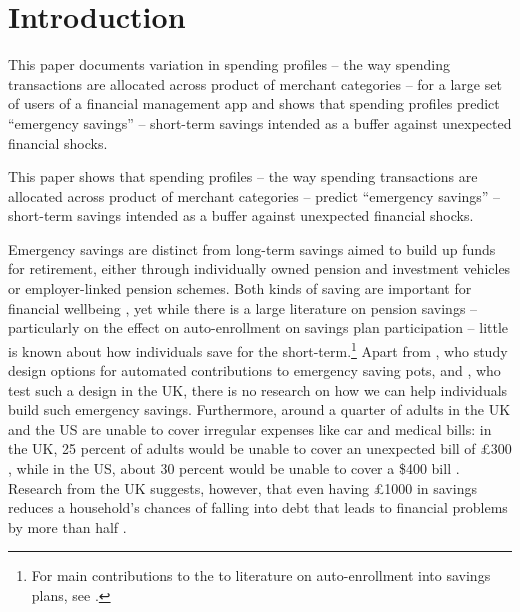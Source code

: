 
\section{Introduction}%
\label{sec:introduction}

{\color{red} This paper documents variation in spending profiles -- the way spending
transactions are allocated across product of merchant categories -- for a large
set of users of a financial management app and shows that spending profiles
predict ``emergency savings'' -- short-term savings intended as a buffer
against unexpected financial shocks.}

{\color{blue} This paper shows that spending profiles -- the way spending
transactions are allocated across product of merchant categories --
predict ``emergency savings'' -- short-term savings intended as a buffer
against unexpected financial shocks.}

Emergency savings are distinct from long-term savings aimed to build up funds
for retirement, either through individually owned pension and investment
vehicles or employer-linked pension schemes. Both kinds of saving are important
for financial wellbeing \citep{mps2018building, cfpb2017financial}, yet while
there is a large literature on pension savings -- particularly on the effect on
auto-enrollment on savings plan participation -- little is known about how
individuals save for the short-term.\footnote{For main contributions to the to
literature on auto-enrollment into savings plans, see \citet{madrian2001power,
choi2002defined, choi2004better, beshears2009importance}.} Apart from
\citet{beshears2020building}, who study design options for automated
contributions to emergency saving pots, and \citet{phillips2021supporting}, who
test such a design in the UK, there is no research on how we can help
individuals build such emergency savings. Furthermore, around a quarter of
adults in the UK and the US are unable to cover irregular expenses like car and
medical bills: in the UK, 25 percent of adults would be unable to cover an
unexpected bill of \pounds300 \citep{phillips2021supporting}, while in the US,
about 30 percent would be unable to cover a \$400 bill \citep{fed2022economic}.
Research from the UK suggests, however, that even having \pounds1000 in savings
reduces a household's chances of falling into debt that leads
to financial problems by more than half \citep{phillips2021supporting}.

